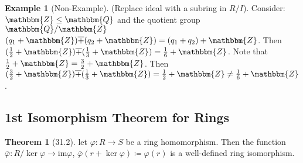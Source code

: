 \documentclass{article}
\newcommand{\Z}{\mathbbm{Z}}
\newcommand{\Q}{\mathbbm{Q}}
\newcommand{\coleq}{\coloneqq}
\newcommand{\func}[3]{#1: #2 \to #3}
\theoremstyle{definition}
\newtheorem*{thm}{Theorem}
\newtheorem*{ex}{Example}
\theoremstyle{remark}
\newcommand{\im}{\mathrm{im}}
\begin{document}
{{            \begin{ex}[Non-Example]
                (Replace ideal with a subring in $R/I$). Consider: $\Z\leq \Q$ and the quotient group $\Q/\Z$ $(q_1+\Z)\overline{+}(q_2+\Z)=(q_1+q_2)+\Z$. Then $(\frac{1}{2}+\Z)\overline{+}(\frac{1}{3}+\Z)=\frac{1}{6}+\Z$. Note that $\frac{1}{2}+\Z=\frac{3}{2}+\Z$. Then $(\frac{3}{2}+\Z)\overline{+}(\frac{1}{3}+\Z)=\frac{1}{2}+\Z \neq \frac{1}{6}+\Z$.
            \end{ex}
        }
        \subsection*{1st Isomorphism Theorem for Rings}{
            \begin{thm}[31.2]
                let $\func{\varphi}{R}{S}$ be a ring homomorphism. Then the function $\func{\overline{\varphi}}{R/\ker\varphi}{\im\varphi}$, $\overline{\varphi}(r+\ker\varphi)\coleq \varphi(r)$ is a well-defined ring isomorphism.
            \end{thm}
        
        }
    }
    
\end{document}
